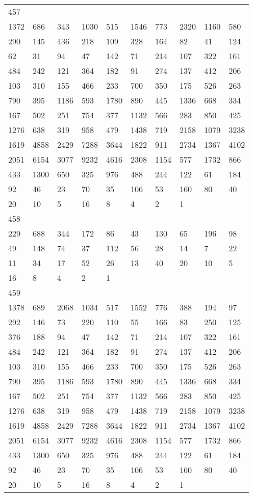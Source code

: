 \begin{longtable}{*{10}{l}}
457&&&&&&&&&\\
1372& 686& 343& 1030& 515& 1546& 773& 2320& 1160& 580\\
290& 145& 436& 218& 109& 328& 164& 82& 41& 124\\
62& 31& 94& 47& 142& 71& 214& 107& 322& 161\\
484& 242& 121& 364& 182& 91& 274& 137& 412& 206\\
103& 310& 155& 466& 233& 700& 350& 175& 526& 263\\
790& 395& 1186& 593& 1780& 890& 445& 1336& 668& 334\\
167& 502& 251& 754& 377& 1132& 566& 283& 850& 425\\
1276& 638& 319& 958& 479& 1438& 719& 2158& 1079& 3238\\
1619& 4858& 2429& 7288& 3644& 1822& 911& 2734& 1367& 4102\\
2051& 6154& 3077& 9232& 4616& 2308& 1154& 577& 1732& 866\\
433& 1300& 650& 325& 976& 488& 244& 122& 61& 184\\
92& 46& 23& 70& 35& 106& 53& 160& 80& 40\\
20& 10& 5& 16& 8& 4& 2& 1& \\

458&&&&&&&&&\\
229& 688& 344& 172& 86& 43& 130& 65& 196& 98\\
49& 148& 74& 37& 112& 56& 28& 14& 7& 22\\
11& 34& 17& 52& 26& 13& 40& 20& 10& 5\\
16& 8& 4& 2& 1& \\

459&&&&&&&&&\\
1378& 689& 2068& 1034& 517& 1552& 776& 388& 194& 97\\
292& 146& 73& 220& 110& 55& 166& 83& 250& 125\\
376& 188& 94& 47& 142& 71& 214& 107& 322& 161\\
484& 242& 121& 364& 182& 91& 274& 137& 412& 206\\
103& 310& 155& 466& 233& 700& 350& 175& 526& 263\\
790& 395& 1186& 593& 1780& 890& 445& 1336& 668& 334\\
167& 502& 251& 754& 377& 1132& 566& 283& 850& 425\\
1276& 638& 319& 958& 479& 1438& 719& 2158& 1079& 3238\\
1619& 4858& 2429& 7288& 3644& 1822& 911& 2734& 1367& 4102\\
2051& 6154& 3077& 9232& 4616& 2308& 1154& 577& 1732& 866\\
433& 1300& 650& 325& 976& 488& 244& 122& 61& 184\\
92& 46& 23& 70& 35& 106& 53& 160& 80& 40\\
20& 10& 5& 16& 8& 4& 2& 1& \\


\end{longtable}
